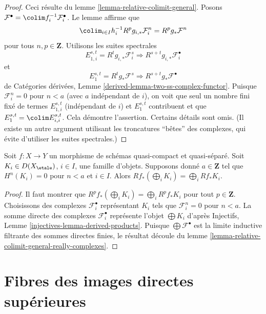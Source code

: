 \begin{proof}
Ceci r\'esulte du lemme \ref{lemma-relative-colimit-general}. Posons
$\mathcal{F}^\bullet = \colim f_i^{-1}\mathcal{F}_i^\bullet$.
Le lemme affirme que
$$
\colim_{i \in I} h_i^{-1}R^pg_{i, *}\mathcal{F}_i^n = R^pg_*\mathcal{F}^n
$$
pour tous $n, p \in \mathbf{Z}$. Utilisons les suites spectrales
$$
E_{1, i}^{s, t} = R^tg_{i, *}\mathcal{F}_i^s \Rightarrow
R^{s + t}g_{i, *}\mathcal{F}_i^\bullet
$$
et
$$
E_1^{s, t} = R^tg_*\mathcal{F}^s \Rightarrow
R^{s + t}g_*\mathcal{F}^\bullet
$$
de Cat\'egories d\'eriv\'ees, Lemme \ref{derived-lemma-two-ss-complex-functor}.
Puisque $\mathcal{F}_i^n = 0$ pour $n < a$ (avec $a$ ind\'ependant de $i$),
on voit que seul un nombre fini fix\'e de termes $E_{1, i}^{s, t}$
(ind\'ependant de $i$) et $E_1^{s, t}$ contribuent et que
$E_1^{s, t} = \colim E_{i, i}^{s, t}$.
Cela d\'emontre l'assertion. Certains d\'etails sont omis.
(Il existe un autre argument utilisant les troncatures ``b\^etes''
des complexes, qui \'evite d'utiliser les suites spectrales.)
\end{proof}

\begin{lemma}
\label{lemma-direct-sum-bounded-below-pushforward}
Soit $f : X \to Y$ un morphisme de sch\'emas quasi-compact et quasi-s\'epar\'e.
Soit $K_i \in D(X_\etale)$, $i \in I$, une famille d'objets.
Supposons donn\'e $a \in \mathbf{Z}$ tel que $H^n(K_i) = 0$ pour $n < a$
et $i \in I$. Alors $Rf_*(\bigoplus_i K_i) = \bigoplus_i Rf_*K_i$.
\end{lemma}

\begin{proof}
Il faut montrer que $R^pf_*(\bigoplus_i K_i) =
\bigoplus_i R^pf_*K_i$ pour tout $p \in \mathbf{Z}$.
Choisissons des complexes $\mathcal{F}_i^\bullet$ repr\'esentant $K_i$
tels que $\mathcal{F}_i^n = 0$ pour $n < a$.
La somme directe des complexes $\mathcal{F}_i^\bullet$
repr\'esente l'objet $\bigoplus K_i$ d'apr\`es
Injectifs, Lemme \ref{injectives-lemma-derived-products}.
Puisque $\bigoplus \mathcal{F}^\bullet$ est la limite inductive filtrante
des sommes directes finies, le r\'esultat d\'ecoule
du lemme \ref{lemma-relative-colimit-general-really-complexes}.
\end{proof}














\section{Fibres des images directes sup\'erieures}
\label{section-stalks-direct-image}

